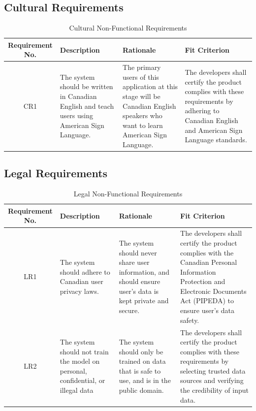 \documentclass[12pt, titlepage]{article}
\begin{document}
\subsection{Cultural Requirements}

\begin{table}[H]
\caption{Cultural Non-Functional Requirements}
\noindent \begin{tabular}{| c | p{3cm}| p{3cm}| p{3cm}|}
\hline 
\textbf{Requirement No.} & \textbf{Description} & \textbf{Rationale} & \textbf{Fit Criterion}\\
\hline
CR1 & The system should be written in Canadian English and teach users using American Sign Language. & The primary users of this application at this stage will be Canadian English speakers who want to learn American Sign Language. & The developers shall certify the product complies with these requirements by adhering to Canadian English and American Sign Language standards. \\
\bottomrule
\end{tabular}
\end{table}

\subsection{Legal Requirements}

\begin{table}[H]
\caption{Legal Non-Functional Requirements}
\noindent \begin{tabular}{| c | p{3cm}| p{3cm}| p{3cm}|}
\hline 
\textbf{Requirement No.} & \textbf{Description} & \textbf{Rationale} & \textbf{Fit Criterion}\\
\hline
LR1 & The system should adhere to Canadian user privacy laws. &  The system should never share user information, and should ensure user's data is kept private and secure. & The developers shall certify the product complies with the Canadian Personal Information Protection and Electronic Documents Act (PIPEDA) to ensure user's data safety. \\
\hline
LR2 & The system should not train the model on personal, confidential, or illegal data & The system should only be trained on data that is safe to use, and is in the public domain. & The developers shall certify the product complies with these requirements by selecting trusted data sources and verifying the credibility of input data. \\
\bottomrule
\end{tabular}
\end{table}
\end{document}
